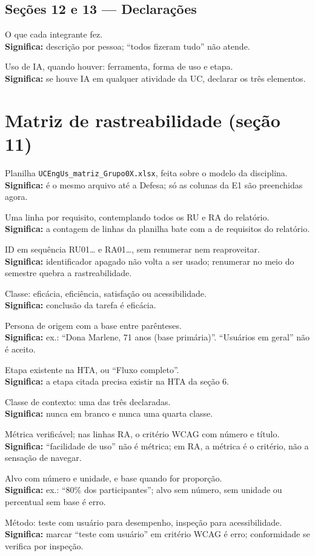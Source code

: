 \documentclass[11pt,a4paper]{article}
\newcommand{\obs}[1]{\\{\small\color{cinza}\textbf{Significa:} #1}}
\begin{document}
\subsection{Seções 12 e 13 --- Declarações}
\begin{checks}
  \item O que cada integrante fez.
    \obs{descrição por pessoa; ``todos fizeram tudo'' não atende.}
  \item Uso de IA, quando houver: ferramenta, forma de uso e etapa.
    \obs{se houve IA em qualquer atividade da UC, declarar os três elementos.}
\end{checks}

\section{Matriz de rastreabilidade (seção 11)}

\begin{checks}
  \item Planilha \texttt{UCEngUs\_matriz\_Grupo0X.xlsx}, feita sobre o modelo da disciplina.
    \obs{é o mesmo arquivo até a Defesa; só as colunas da E1 são preenchidas agora.}
  \item Uma linha por requisito, contemplando todos os RU e RA do relatório.
    \obs{a contagem de linhas da planilha bate com a de requisitos do relatório.}
  \item ID em sequência RU01\ldots{} e RA01\ldots, sem renumerar nem reaproveitar.
    \obs{identificador apagado não volta a ser usado; renumerar no meio do semestre quebra a rastreabilidade.}
  \item Classe: eficácia, eficiência, satisfação ou acessibilidade.
    \obs{conclusão da tarefa é eficácia.}
  \item Persona de origem com a base entre parênteses.
    \obs{ex.: ``Dona Marlene, 71 anos (base primária)''. ``Usuários em geral'' não é aceito.}
  \item Etapa existente na HTA, ou ``Fluxo completo''.
    \obs{a etapa citada precisa existir na HTA da seção 6.}
  \item Classe de contexto: uma das três declaradas.
    \obs{nunca em branco e nunca uma quarta classe.}
  \item Métrica verificável; nas linhas RA, o critério WCAG com número e título.
    \obs{``facilidade de uso'' não é métrica; em RA, a métrica é o critério, não a sensação de navegar.}
  \item Alvo com número e unidade, e base quando for proporção.
    \obs{ex.: ``80\% dos participantes''; alvo sem número, sem unidade ou percentual sem base é erro.}
  \item Método: teste com usuário para desempenho, inspeção para acessibilidade.
    \obs{marcar ``teste com usuário'' em critério WCAG é erro; conformidade se verifica por inspeção.}
\end{checks}
\end{document}
